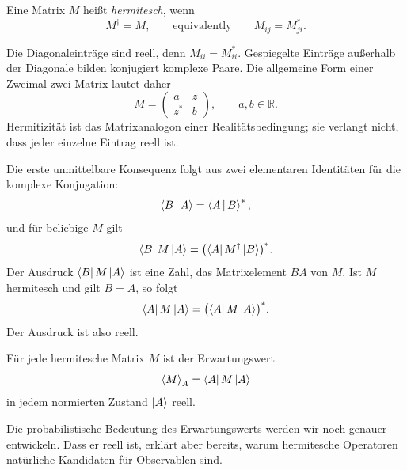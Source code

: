\begin{definition}
Eine Matrix \(M\) heißt \emph{hermitesch}, wenn
\begin{equation}
  M^\dagger=M,
  \qquad\text{equivalently}\qquad
  M_{ij}=M_{ji}^*.
  \label{eq:l03-hermitian}
\end{equation}
\end{definition}

Die Diagonaleinträge sind reell, denn \(M_{ii}=M_{ii}^*\). Gespiegelte Einträge außerhalb der Diagonale bilden konjugiert komplexe Paare. Die allgemeine Form einer Zweimal-zwei-Matrix lautet daher
\begin{equation}
  M=
  \begin{pmatrix}
    a&z\\
    z^*&b
  \end{pmatrix},
  \qquad a,b\in\mathbb R.
  \label{eq:l03-hermitian-two}
\end{equation}
Hermitizität ist das Matrixanalogon einer Realitätsbedingung; sie verlangt nicht, dass jeder einzelne Eintrag reell ist.

Die erste unmittelbare Konsequenz folgt aus zwei elementaren Identitäten für die komplexe Konjugation:
\begin{equation}
  \left\langle B\,\middle|\,A\right\rangle=\left\langle A\,\middle|\,B\right\rangle^*,
  \label{eq:l03-inner-conjugation}
\end{equation}
und für beliebige \(M\) gilt
\begin{equation}
  \left\langle B\right\rvert M\left\lvert A\right\rangle
  =
  \bigl(\left\langle A\right\rvert M^\dagger\left\lvert B\right\rangle\bigr)^*.
  \label{eq:l03-matrix-element-conjugation}
\end{equation}
Der Ausdruck \(\left\langle B\right\rvert M\left\lvert A\right\rangle\) ist eine Zahl, das Matrixelement \(BA\) von \(M\). Ist \(M\) hermitesch und gilt \(B=A\), so folgt
\begin{equation}
  \left\langle A\right\rvert M\left\lvert A\right\rangle
  =
  \bigl(\left\langle A\right\rvert M\left\lvert A\right\rangle\bigr)^*.
\end{equation}
Der Ausdruck ist also reell.

\begin{proposition}
Für jede hermitesche Matrix \(M\) ist der Erwartungswert
\begin{equation}
  \left\langle M\right\rangle_A=\left\langle A\right\rvert M\left\lvert A\right\rangle
  \label{eq:l03-expectation}
\end{equation}
in jedem normierten Zustand \(\left\lvert A\right\rangle\) reell.
\end{proposition}

Die probabilistische Bedeutung des Erwartungswerts werden wir noch genauer entwickeln. Dass er reell ist, erklärt aber bereits, warum hermitesche Operatoren natürliche Kandidaten für Observablen sind.

